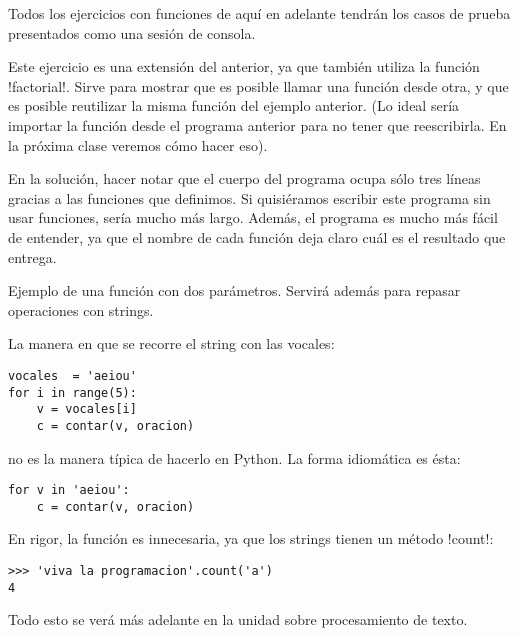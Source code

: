 \documentclass[10pt]{article}
\begin{document}
  Todos los ejercicios con funciones de aquí en adelante
  tendrán los casos de prueba presentados
  como una sesión de consola.


  Este ejercicio es una extensión del anterior,
  ya que también utiliza la función \li!factorial!.
  Sirve para mostrar que es posible llamar una función desde otra,
  y que es posible reutilizar la misma función del ejemplo anterior.
  (Lo ideal sería importar la función desde el programa anterior
  para no tener que reescribirla.
  En la próxima clase veremos cómo hacer eso).

  En la solución,
  hacer notar que el cuerpo del programa ocupa sólo tres líneas
  gracias a las funciones que definimos.
  Si quisiéramos escribir este programa sin usar funciones,
  sería mucho más largo.
  Además,
  el programa es mucho más fácil de entender,
  ya que el nombre de cada función deja claro cuál es el resultado que entrega.


  Ejemplo de una función con dos parámetros.
  Servirá además para repasar operaciones con strings.

  La manera en que se recorre el string con las vocales:
  \begin{lstlisting}
vocales  = 'aeiou'
for i in range(5):
    v = vocales[i]
    c = contar(v, oracion)
  \end{lstlisting}
  no es la manera típica de hacerlo en Python.
  La forma idiomática es ésta:
  \begin{lstlisting}
for v in 'aeiou':
    c = contar(v, oracion)
  \end{lstlisting}

  En rigor, la función es innecesaria,
  ya que los strings tienen un método \li!count!:
  \begin{lstlisting}
>>> 'viva la programacion'.count('a')
4
  \end{lstlisting}



  Todo esto se verá más adelante en la unidad sobre procesamiento de texto.
\end{document}
